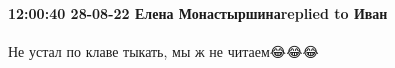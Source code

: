 
 
 
 
 

\paragraph{12:00:40 28-08-22 Елена Монастыршинаreplied to Иван}

Не устал по клаве тыкать, мы ж не читаем😂😂😂
